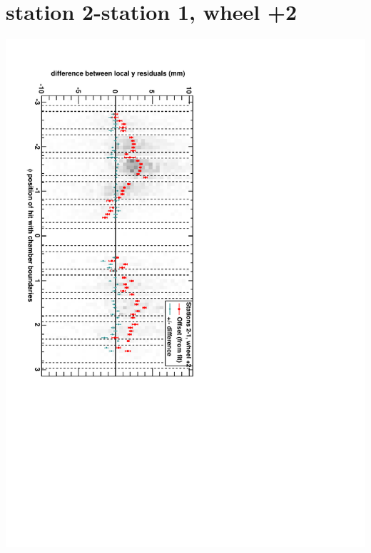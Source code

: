 \documentclass[compress]{beamer}
\begin{document}
\section*{station 2-station 1, wheel +2}
\begin{frame} \vfill \mbox{\hspace{-1 cm}\includegraphics[height=1.2\linewidth, angle=90]{DTzdiff12VsPhi_whE_slope.pdf}} \end{frame}
\end{document}
